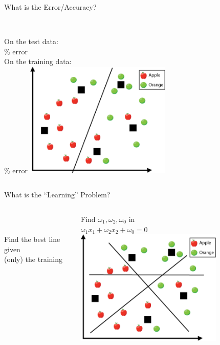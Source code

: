 \documentclass[aspectratio=169, 14pt,usenames,dvipsnames]{beamer}
\begin{document}
\begin{frame}{What is the Error/Accuracy?}
\begin{columns}
\\
	\centering On the test data: \\ \% error \\[8pt]
On the training data: \\ \% error
\includegraphics[width=7cm,height=5.5cm]{Images/8lcla.png}
\end{columns}
\end{frame}




\begin{frame}{What is the “Learning” Problem?}
\begin{columns}
	 \\
\\
Find the best line given \\ (only) the training \vspace{12pt}{data}

 
Find \alert{$\omega_1, \omega_2, \omega_0$} in \\ \alert{$\omega_1x_1 + \omega_2x_2 +\omega_0 = 0$}
\includegraphics[width=7cm,height=5.5cm]{Images/10lcla.png}
\end{columns}
\end{frame}
\end{document}
